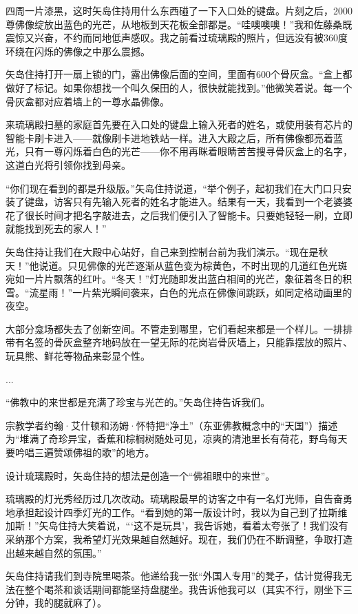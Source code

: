 \documentclass[12pt,oneside]{book}
\begin{document}
\begin{bookref}[frametitle={\cite{好好告别}}]
四周一片漆黑，这时矢岛住持用什么东西碰了一下入口处的键盘。片刻之后，2000尊佛像绽放出蓝色的光芒，从地板到天花板全部都是。“哇噢噢噢！”我和佐藤桑既震惊又兴奋，不约而同地低声感叹。我之前看过琉璃殿的照片，但远没有被360度环绕在闪烁的佛像之中那么震撼。

矢岛住持打开一扇上锁的门，露出佛像后面的空间，里面有600个骨灰盒。“盒上都做好了标记。如果你想找一个叫久保田的人，很快就能找到。”他微笑着说。每一个骨灰盒都对应着墙上的一尊水晶佛像。

来琉璃殿扫墓的家庭首先要在入口处的键盘上输入死者的姓名，或使用装有芯片的智能卡刷卡进入——就像刷卡进地铁站一样。进入大殿之后，所有佛像都亮着蓝光，只有一尊闪烁着白色的光芒——你不用再眯着眼睛苦苦搜寻骨灰盒上的名字，这道白光将引领你找到母亲。

“你们现在看到的都是升级版。”矢岛住持说道，“举个例子，起初我们在大门口只安装了键盘，访客只有先输入死者的姓名才能进入。结果有一天，我看到一个老婆婆花了很长时间才把名字敲进去，之后我们便引入了智能卡。只要她轻轻一刷，立即就能找到死去的家人！”

矢岛住持让我们在大殿中心站好，自己来到控制台前为我们演示。“现在是秋天！”他说道。只见佛像的光芒逐渐从蓝色变为棕黄色，不时出现的几道红色光斑宛如一片片飘落的红叶。“冬天！”灯光随即发出蓝白相间的光芒，象征着冬日的积雪。“流星雨！”一片紫光瞬间袭来，白色的光点在佛像间跳跃，如同定格动画里的夜空。

大部分龛场都失去了创新空间。不管走到哪里，它们看起来都是一个样儿。一排排带有名签的骨灰盒整齐地码放在一望无际的花岗岩骨灰墙上，只能靠摆放的照片、玩具熊、鲜花等物品来彰显个性。

...

“佛教中的来世都是充满了珍宝与光芒的。”矢岛住持告诉我们。

宗教学者约翰·艾什顿和汤姆·怀特把“净土”（东亚佛教概念中的“天国”）描述为“堆满了奇珍异宝，香蕉和棕榈树随处可见，凉爽的清池里长有荷花，野鸟每天要吟唱三遍赞颂佛祖的歌”的地方。

设计琉璃殿时，矢岛住持的想法是创造一个“佛祖眼中的来世”。

琉璃殿的灯光秀经历过几次改动。琉璃殿最早的访客之中有一名灯光师，自告奋勇地承担起设计四季灯光的工作。“看到她的第一版设计时，我以为自己到了拉斯维加斯！”矢岛住持大笑着说，“‘这不是玩具’，我告诉她，看着太夸张了！我们没有采纳那个方案，我希望灯光效果越自然越好。现在，我们仍在不断调整，争取打造出越来越自然的氛围。”

矢岛住持请我们到寺院里喝茶。他递给我一张“外国人专用”的凳子，估计觉得我无法在整个喝茶和谈话期间都能坚持盘腿坐。我告诉他我可以（其实不行，刚坐下三分钟，我的腿就麻了）。


\end{bookref}
\end{document}

